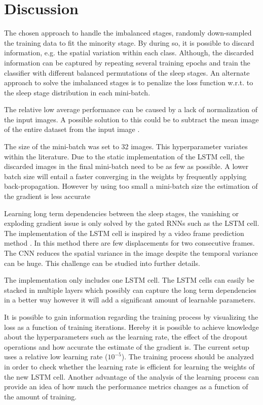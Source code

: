 \section{Discussion}
\label{sec:discussion}

The chosen approach to handle the imbalanced stages, randomly down-sampled the training data to fit the minority stage.
By during so, it is possible to discard information, e.g. the spatial variation within each class. 
Although, the discarded information can be captured by repeating several training epochs and train the classifier with different balanced permutations of the sleep stages.
An alternate approach to solve the imbalanced stages is to penalize the loss function w.r.t. to the sleep stage distribution in each mini-batch.

The relative low average performance can be caused by a lack of normalization of the input images. A possible solution to this could be to subtract the mean image of the entire dataset from the input image \cite{	main_ar,VGGnet16}.

The size of the mini-batch was set to 32 images. This hyperparameter variates within the literature. Due to the static implementation of the LSTM cell, the discarded images in the final mini-batch need to be as few as possible. A lower batch size will entail a faster converging in the weights by frequently applying back-propagation. However by using too small a mini-batch size the estimation of the gradient is less accurate 

Learning long term dependencies between the sleep stages, the vanishing or exploding gradient issue is only solved by the gated RNNs such as the LSTM cell. The implementation of the LSTM cell is inspired by a video frame prediction method \cite{git_lstm}. In this method there are few displacements for two consecutive frames. The CNN reduces the spatial variance in the image despite the temporal variance can be huge. This challenge can be studied into further details.

The implementation only includes one LSTM cell. The LSTM cells can easily be stacked in multiple layers which possibly can capture the long term dependencies in a better way however it will add a significant amount of learnable parameters.

It is possible to gain information regarding the training process by visualizing the loss as a function of training iterations. 
Hereby it is possible to achieve knowledge about the hyperparameters such as the learning rate, the effect of the dropout operations and how accurate the estimate of the gradient is. The current setup uses a relative low learning rate ($10^{-5}$). 
The training process should be analyzed in order to check whether the learning rate is efficient for learning the weights of the new LSTM cell.
Another advantage of the analysis of the learning process can provide an idea of how much the performance metrics changes as a function of the amount of training. 

